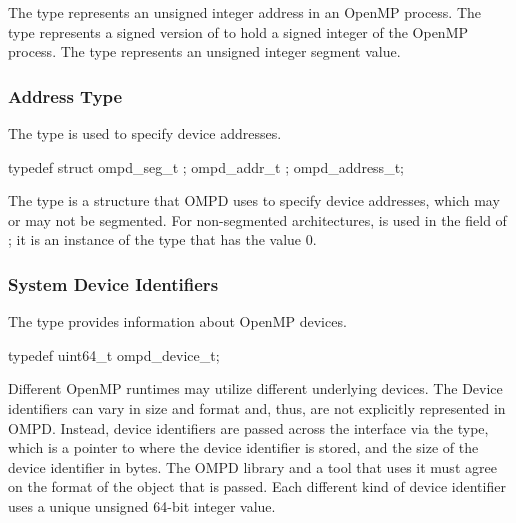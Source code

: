 \descr
The  type represents an unsigned integer address in an
OpenMP process. The  type represents a signed version of 
 to hold a signed integer of the OpenMP process. The 
 type represents an unsigned integer segment value.



\subsubsection{Address Type}
\label{subsubsubsec:ompd_address_t}

\summary
The  type is used to specify device addresses.

\format
\begin{ccppspecific}
\begin{ompEnv}
typedef struct {
  ompd_seg_t ;
  ompd_addr_t ;
} ompd_address_t;
\end{ompEnv}
\end{ccppspecific}

\descr
The  type is a structure that OMPD uses to specify 
device addresses, which may or may not be segmented. For non-segmented 
architectures,  is used in the  
field of ; it is an instance of the  
type that has the value 0.



\subsubsection{System Device Identifiers}
\label{ompd:omp_device_t}

\summary
The  type provides information about OpenMP devices.

\format
\begin{ccppspecific}
\begin{ompSyntax}
typedef uint64_t ompd_device_t;
\end{ompSyntax}
\end{ccppspecific}

\descr
Different OpenMP runtimes may utilize different underlying devices. The 
Device identifiers can vary in size and format and, thus, are not explicitly 
represented in OMPD. Instead, device identifiers are passed across the interface 
via the  type, which is a pointer to where the device 
identifier is stored, and the size of the device identifier in bytes. The 
OMPD library and a tool that uses it must agree on the format of the object 
that is passed. Each different kind of device identifier uses a unique 
unsigned 64-bit integer value.

